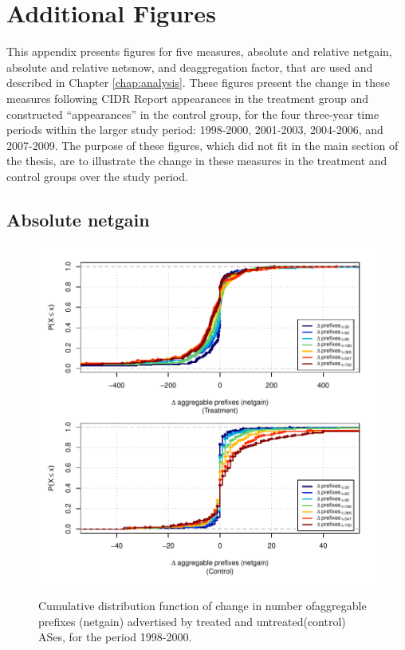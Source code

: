 \chapter{Additional Figures}
\label{chap:additional_figs}

This appendix presents figures for five measures, absolute and relative
netgain, absolute and relative netsnow, and deaggregation factor, that are used
and described in Chapter \ref{chap:analysis}. These figures present the change
in these measures following CIDR Report appearances in the treatment group and
constructed ``appearances'' in the control group, for the four three-year time
periods within the larger study period: 1998-2000, 2001-2003, 2004-2006, and
2007-2009. The purpose of these figures, which did not fit in the main section
of the thesis, are to illustrate the change in these measures in the treatment
and control groups over the study period.

\clearpage
\section{Absolute netgain}

\begin{figure}[H]
\begin{centering}
\begin{singlespace}
\captionsetup{list=no}
    \includegraphics[width=6in]{figures/behavior-netgain-1998_2000-corr.pdf}
    \vspace{-2em}\\
    \caption{Cumulative distribution function of change in number ofaggregable
    prefixes (netgain) advertised by treated and untreated(control) ASes, for
    the period 1998-2000.}
\end{singlespace}
\end{centering}
\end{figure}

